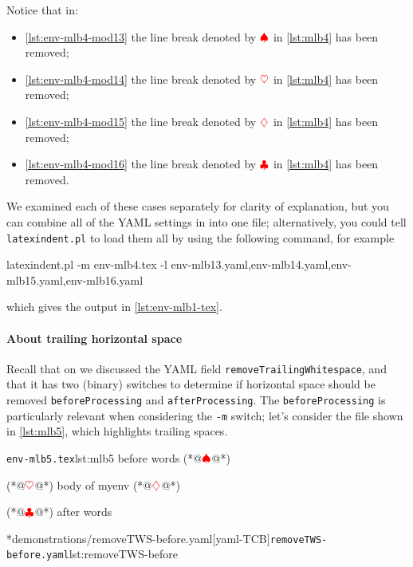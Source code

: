 		Notice that in:
		\begin{itemize}
			\item \cref{lst:env-mlb4-mod13} the line break denoted by $\color{red}\spadesuit$ in
			      \cref{lst:mlb4} has been removed;
			\item \cref{lst:env-mlb4-mod14} the line break denoted by $\color{red}\heartsuit$ in
			      \cref{lst:mlb4} has been removed;
			\item \cref{lst:env-mlb4-mod15} the line break denoted by $\color{red}\diamondsuit$ in
			      \cref{lst:mlb4} has been removed;
			\item \cref{lst:env-mlb4-mod16} the line break denoted by $\color{red}\clubsuit$ in
			      \cref{lst:mlb4} has been removed.
		\end{itemize}
		We examined each of these cases separately for clarity of explanation, but you can
		combine all of the YAML settings in  into one
		file; alternatively, you could tell \texttt{latexindent.pl} to load them all by using the
		following command, for example
		\begin{widepage}
			\begin{commandshell}
latexindent.pl -m env-mlb4.tex -l env-mlb13.yaml,env-mlb14.yaml,env-mlb15.yaml,env-mlb16.yaml
\end{commandshell}
		\end{widepage}
		which gives the output in \vref{lst:env-mlb1-tex}.

	\paragraph{About trailing horizontal space}
		Recall that on  we discussed the YAML field
		\texttt{removeTrailingWhitespace}, and that it has two (binary) switches to determine if
		horizontal space should be removed \texttt{beforeProcessing} and
		\texttt{afterProcessing}. The \texttt{beforeProcessing} is particularly relevant when
		considering the \texttt{-m} switch; let's consider the file shown in \cref{lst:mlb5},
		which highlights trailing spaces.

		\begin{cmhtcbraster}
			\begin{cmhlistings}[style=tcblatex,showspaces=true,escapeinside={(*@}{@*)}]{\texttt{env-mlb5.tex}}{lst:mlb5}
before words   (*@$\color{red}\spadesuit$@*) 
\begin{myenv}           (*@$\color{red}\heartsuit$@*)
body of myenv      (*@$\color{red}\diamondsuit$@*) 
\end{myenv}     (*@$\color{red}\clubsuit$@*)
after words
\end{cmhlistings}
			\cmhlistingsfromfile[style=yaml-LST]*{demonstrations/removeTWS-before.yaml}[yaml-TCB]{\texttt{removeTWS-before.yaml}}{lst:removeTWS-before}
		\end{cmhtcbraster}

